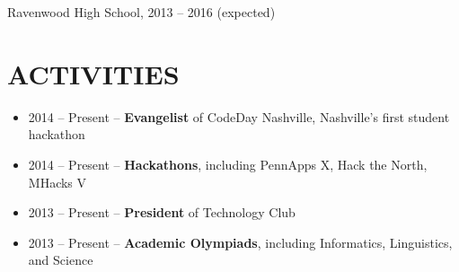\documentclass{res}
\begin{document}
Ravenwood High School, 2013 -- 2016 {(expected)}

\section{ACTIVITIES}

\begin{itemize}
  \item 2014 -- Present -- \textbf{Evangelist} of CodeDay Nashville, Nashville's first student hackathon
  \item 2014 -- Present -- \textbf{Hackathons}, including PennApps X, Hack the North, MHacks V
  \item 2013 -- Present -- \textbf{President} of Technology Club
  \item 2013 -- Present -- \textbf{Academic Olympiads}, including Informatics, Linguistics, and Science
\end{itemize}
\end{document}
